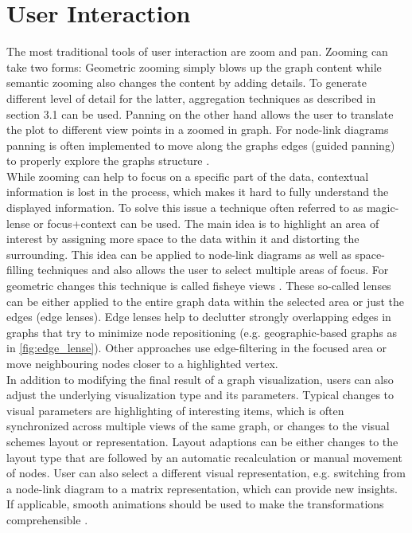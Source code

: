 \section{User Interaction}
The most traditional tools of user interaction are zoom and pan. Zooming can take two forms: Geometric zooming simply blows up the graph content while semantic zooming also changes the content by adding details\cite{Herman2000}. To generate different level of detail for the latter, aggregation techniques as described in section 3.1 can be used. Panning on the other hand allows the user to translate the plot to different view points in a zoomed in graph. For node-link diagrams panning is often implemented to move along the graphs edges (guided panning) to properly explore the graphs structure \cite{VonLandesberger2011}.\\ 
While zooming can help to focus on a specific part of the data, contextual information is lost in the process, which makes it hard to fully understand the displayed information. To solve this issue a technique often referred to as magic-lense \cite{VonLandesberger2011} or focus+context \cite{Herman2000} can be used. The main idea is to highlight an area of interest by assigning more space to the data within it and distorting the surrounding. This idea can be applied to node-link diagrams as well as space-filling techniques and also allows the user to select multiple areas of focus. For geometric changes this technique is called fisheye views \cite{VonLandesberger2011}. These so-called lenses can be either applied to the entire graph data within the selected area or just the edges (edge lenses). Edge lenses help to declutter strongly overlapping edges in graphs that try to minimize node repositioning (e.g. geographic-based graphs as in \autoref{fig:edge_lense}). Other approaches use edge-filtering in the focused area or move neighbouring nodes closer to a highlighted vertex.\\
In addition to modifying the final result of a graph visualization, users can also adjust the underlying visualization type and its parameters. Typical changes to visual parameters are highlighting of interesting items, which is often synchronized across multiple views of the same graph, or changes to the visual schemes layout or representation. Layout adaptions can be either changes to the layout type that are followed by an automatic recalculation or manual movement of nodes. User can also select a different visual representation, e.g. switching from a node-link diagram to a matrix representation, which can provide new insights. If applicable, smooth animations should be used to make the transformations comprehensible \cite{VonLandesberger2011}.



